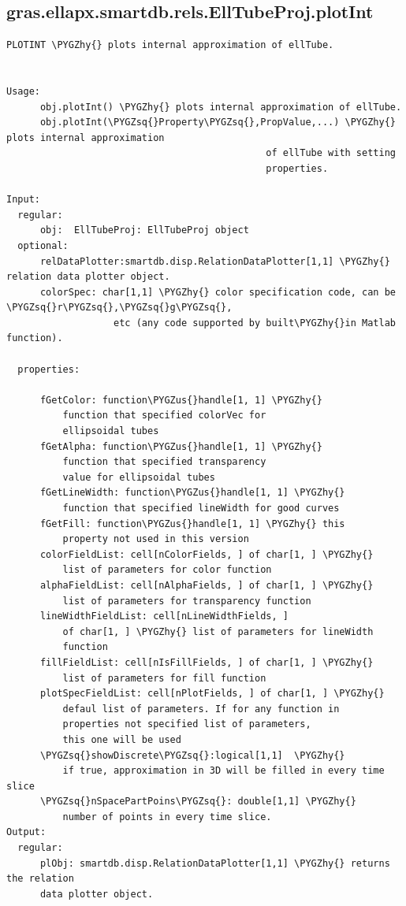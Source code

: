 \documentclass[letterpaper,10pt,english]{sphinxmanual}
\def\PYGZus{\char`\_}
\def\PYGZhy{\char`\-}
\def\PYGZsq{\char`\'}
\begin{document}
\subsection{gras.ellapx.smartdb.rels.EllTubeProj.plotInt}
\label{chap_functions:gras-ellapx-smartdb-rels-elltubeproj-plotint}
\begin{Verbatim}[commandchars=\\\{\}]
PLOTINT \PYGZhy{} plots internal approximation of ellTube.


Usage:
      obj.plotInt() \PYGZhy{} plots internal approximation of ellTube.
      obj.plotInt(\PYGZsq{}Property\PYGZsq{},PropValue,...) \PYGZhy{} plots internal approximation
                                              of ellTube with setting
                                              properties.

Input:
  regular:
      obj:  EllTubeProj: EllTubeProj object
  optional:
      relDataPlotter:smartdb.disp.RelationDataPlotter[1,1] \PYGZhy{} relation data plotter object.
      colorSpec: char[1,1] \PYGZhy{} color specification code, can be \PYGZsq{}r\PYGZsq{},\PYGZsq{}g\PYGZsq{},
                   etc (any code supported by built\PYGZhy{}in Matlab function).

  properties:

      fGetColor: function\PYGZus{}handle[1, 1] \PYGZhy{}
          function that specified colorVec for
          ellipsoidal tubes
      fGetAlpha: function\PYGZus{}handle[1, 1] \PYGZhy{}
          function that specified transparency
          value for ellipsoidal tubes
      fGetLineWidth: function\PYGZus{}handle[1, 1] \PYGZhy{}
          function that specified lineWidth for good curves
      fGetFill: function\PYGZus{}handle[1, 1] \PYGZhy{} this
          property not used in this version
      colorFieldList: cell[nColorFields, ] of char[1, ] \PYGZhy{}
          list of parameters for color function
      alphaFieldList: cell[nAlphaFields, ] of char[1, ] \PYGZhy{}
          list of parameters for transparency function
      lineWidthFieldList: cell[nLineWidthFields, ]
          of char[1, ] \PYGZhy{} list of parameters for lineWidth
          function
      fillFieldList: cell[nIsFillFields, ] of char[1, ] \PYGZhy{}
          list of parameters for fill function
      plotSpecFieldList: cell[nPlotFields, ] of char[1, ] \PYGZhy{}
          defaul list of parameters. If for any function in
          properties not specified list of parameters,
          this one will be used
      \PYGZsq{}showDiscrete\PYGZsq{}:logical[1,1]  \PYGZhy{}
          if true, approximation in 3D will be filled in every time slice
      \PYGZsq{}nSpacePartPoins\PYGZsq{}: double[1,1] \PYGZhy{}
          number of points in every time slice.
Output:
  regular:
      plObj: smartdb.disp.RelationDataPlotter[1,1] \PYGZhy{} returns the relation
      data plotter object.
\end{Verbatim}
\end{document}
